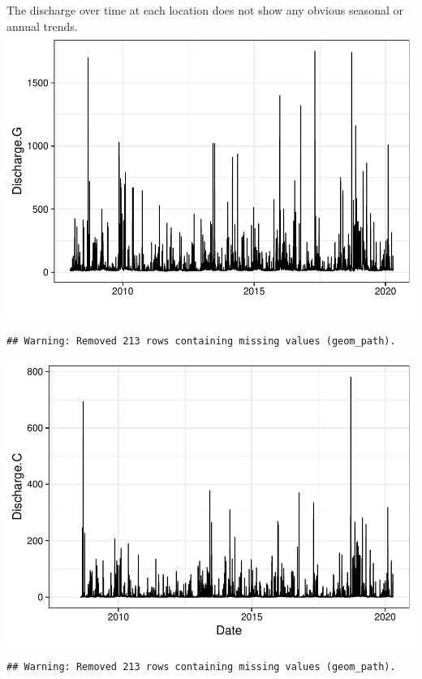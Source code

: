 \documentclass[12pt,]{article}
\begin{document}
The discharge over time at each location does not show any obvious
seasonal or annual trends.
\includegraphics{Landman_ENV872_Project_files/figure-latex/unnamed-chunk-2-1.pdf}

\begin{verbatim}
## Warning: Removed 213 rows containing missing values (geom_path).
\end{verbatim}

\includegraphics{Landman_ENV872_Project_files/figure-latex/unnamed-chunk-2-2.pdf}

\begin{verbatim}
## Warning: Removed 213 rows containing missing values (geom_path).
\end{verbatim}
\end{document}
